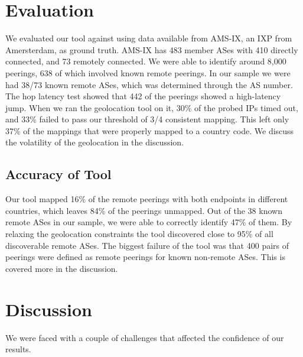 \documentclass{acm_proc_article-sp}
\begin{document}
\section{Evaluation}
\label{sec:evaluation}
We evaluated our tool against using data available from AMS-IX, an IXP from Amersterdam, as ground truth.
AMS-IX has 483 member ASes with 410 directly connected, and 73 remotely connected.
We were able to identify around 8,000 peerings, 638 of which involved known remote peerings.
In our sample we were had 38/73 known remote ASes, which was determined through the AS number.
The hop latency test showed that 442 of the peerings showed a high-latency jump. When we ran the geolocation tool on it, 30\% of the
probed IPs timed out, and 33\% failed to pass our threshold of 3/4 consistent mapping. This left only 37\% of the mappings that were properly
mapped to a country code. We discuss the volatility of the geolocation in the discussion.
\subsection{Accuracy of Tool}
Our tool mapped 16\% of the remote peerings with both endpoints in different countries, which leaves 84\% of the peerings unmapped.
Out of the 38 known remote ASes in our sample, we were able to correctly identify 47\% of them.  By relaxing the geolocation constraints
the tool discovered close to 95\% of all discoverable remote ASes. The biggest failure of the tool was that 400 pairs of peerings were defined as 
remote peerings for known non-remote ASes. This is covered more in the discussion.
\section{Discussion}
We were faced with a couple of challenges that affected the confidence of our results.
\end{document}
